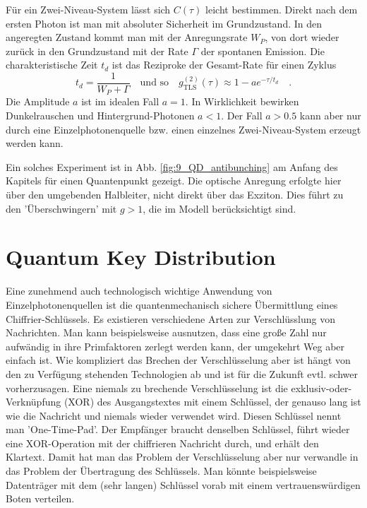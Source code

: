 Für ein Zwei-Niveau-System lässt sich  $C(\tau)$ leicht bestimmen. Direkt nach dem ersten Photon ist man mit absoluter Sicherheit im Grundzustand. In den angeregten Zustand kommt man mit der Anregungsrate $W_P$, von dort wieder zurück in den Grundzustand mit der Rate $\Gamma$ der spontanen Emission. Die charakteristische Zeit $t_d$ ist das Reziproke der Gesamt-Rate für einen Zyklus
\begin{equation}
    t_d = \frac{1}{W_P + \Gamma} \quad \text{und so} \quad  g^{(2)}_\text{TLS}(\tau) \approx 1 - a e^{- \tau / t_d} \quad .
\end{equation}
Die Amplitude $a$ ist im idealen Fall $a=1$. In Wirklichkeit bewirken Dunkelrauschen und Hintergrund-Photonen $a < 1$. Der Fall $a> 0.5$ kann aber nur durch eine Einzelphotonenquelle  bzw. einen einzelnes Zwei-Niveau-System erzeugt werden kann.  

Ein solches Experiment ist in Abb. \ref{fig:9_QD_antibunching} am Anfang des Kapitels für einen  Quantenpunkt  gezeigt. Die optische Anregung erfolgte hier über den umgebenden Halbleiter, nicht direkt über das Exziton. Dies führt zu den 'Überschwingern' mit $g>1$, die im Modell berücksichtigt sind. 





\section{Quantum Key Distribution}

Eine zunehmend auch technologisch wichtige Anwendung von Einzelphotonenquellen ist die quantenmechanisch sichere Übermittlung eines Chiffrier-Schlüssels. Es existieren verschiedene Arten zur Verschlüsslung von Nachrichten. Man kann beispielsweise ausnutzen, dass eine große Zahl nur aufwändig in ihre Primfaktoren zerlegt werden kann, der umgekehrt Weg aber einfach ist. Wie kompliziert das Brechen der Verschlüsselung aber ist hängt von den zu Verfügung stehenden Technologien ab und ist für die Zukunft evtl. schwer vorherzusagen. Eine niemals zu brechende Verschlüsselung ist die exklusiv-oder-Verknüpfung (XOR) des Ausgangstextes mit einem Schlüssel, der genauso lang ist wie die Nachricht und niemals wieder verwendet wird. Diesen Schlüssel nennt man 'One-Time-Pad'. Der Empfänger braucht denselben Schlüssel, führt wieder eine XOR-Operation mit der chiffrieren Nachricht durch, und erhält den Klartext. Damit hat man das Problem der Verschlüsselung aber nur verwandle in das Problem der Übertragung des Schlüssels. Man könnte beispielsweise Datenträger mit dem (sehr langen) Schlüssel vorab mit einem vertrauenswürdigen Boten verteilen.

